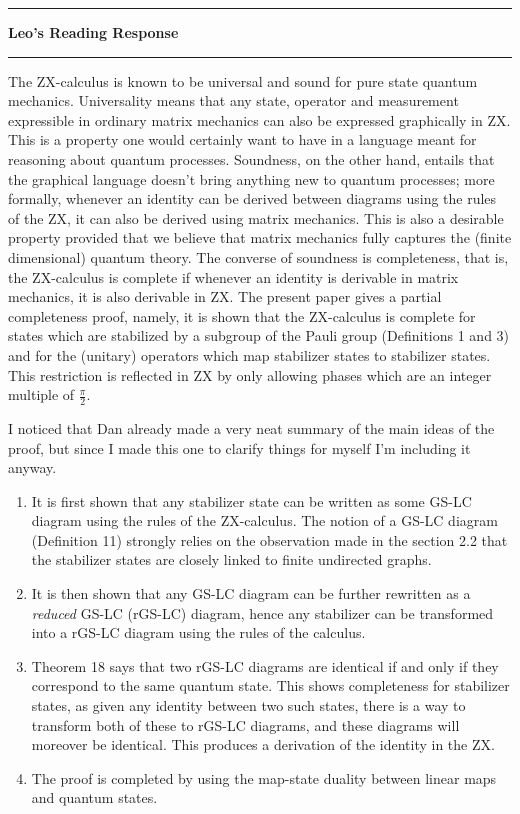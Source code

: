 \documentclass{amsart}
\newcommand{\iam}[1]{
  \vspace{0.25em}
  \hrule
  \vspace{0.25em}
  \textbf{{#1}'s Reading Response}
  \vspace{0.25em}
  \hrule
  \vspace{1em}
}
\begin{document}
\iam{Leo}
The ZX-calculus is known to be universal and sound for pure state quantum mechanics. Universality means that any state, operator and measurement expressible in ordinary matrix mechanics can also be expressed graphically in ZX. This is a property one would certainly want to have in a language meant for reasoning about quantum processes. Soundness, on the other hand, entails that the graphical language doesn't bring anything new to quantum processes; more formally, whenever an identity can be derived between diagrams using the rules of the ZX, it can also be derived using matrix mechanics. This is also a desirable property provided that we believe that matrix mechanics fully captures the (finite dimensional) quantum theory. The converse of soundness is completeness, that is, the ZX-calculus is complete if whenever an identity is derivable in matrix mechanics, it is also derivable in ZX. The present paper gives a partial completeness proof, namely, it is shown that the ZX-calculus is complete for states which are stabilized by a subgroup of the Pauli group (Definitions 1 and 3) and for the (unitary) operators which map stabilizer states to stabilizer states. This restriction is reflected in ZX by only allowing phases which are an integer multiple of $\frac{\pi}{2}$.

I noticed that Dan already made a very neat summary of the main ideas of the proof, but since I made this one to clarify things for myself I'm including it anyway.
\begin{enumerate}
\item It is first shown that any stabilizer state can be written as some GS-LC diagram using the rules of the ZX-calculus. The notion of a GS-LC diagram (Definition 11) strongly relies on the observation made in the section 2.2 that the stabilizer states are closely linked to finite undirected graphs.
\item It is then shown that any GS-LC diagram can be further rewritten as a {\em reduced} GS-LC (rGS-LC) diagram, hence any stabilizer can be transformed into a rGS-LC diagram using the rules of the calculus.
\item Theorem 18 says that two rGS-LC diagrams are identical if and only if they correspond to the same quantum state. This shows completeness for stabilizer states, as given any identity between two such states, there is a way to transform both of these to rGS-LC diagrams, and these diagrams will moreover be identical. This produces a derivation of the identity in the ZX.
\item The proof is completed by using the map-state duality between linear maps and quantum states.
\end{enumerate}
\end{document}
